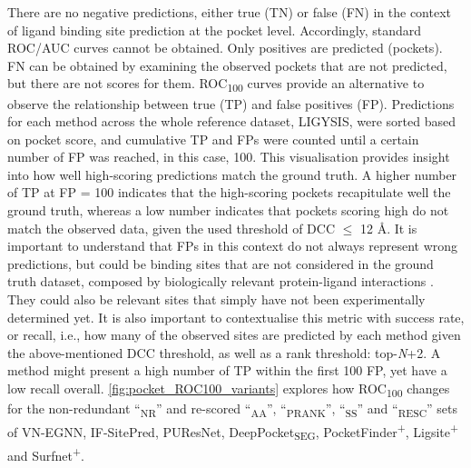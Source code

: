 There are no negative predictions, either true (TN) or false (FN) in the context of ligand binding site prediction at the pocket level. Accordingly, standard ROC/AUC curves cannot be obtained. Only positives are predicted (pockets). FN can be obtained by examining the observed pockets that are not predicted, but there are not scores for them. ROC\textsubscript{100} curves provide an alternative to observe the relationship between true (TP) and false positives (FP). Predictions for each method across the whole reference dataset, LIGYSIS, were sorted based on pocket score, and cumulative TP and FPs were counted until a certain number of FP was reached, in this case, 100. This visualisation provides insight into how well high-scoring predictions match the ground truth. A higher number of TP at FP = 100 indicates that the high-scoring pockets recapitulate well the ground truth, whereas a low number indicates that pockets scoring high do not match the observed data, given the used threshold of DCC $\leq$ 12 \AA{}. It is important to understand that FPs in this context do not always represent wrong predictions, but could be binding sites that are not considered in the ground truth dataset, composed by biologically relevant protein-ligand interactions \cite{YANG_2013_BIOLIP}. They could also be relevant sites that simply have not been experimentally determined yet. It is also important to contextualise this metric with success rate, or recall, i.e., how many of the observed sites are predicted by each method given the above-mentioned DCC threshold, as well as a rank threshold: top-\textit{N}+2. A method might present a high number of TP within the first 100 FP, yet have a low recall overall. \autoref{fig:pocket_ROC100_variants} explores how ROC\textsubscript{100} changes for the non-redundant ``\textsubscript{NR}'' and re-scored ``\textsubscript{AA}'', ``\textsubscript{PRANK}'', ``\textsubscript{SS}'' and ``\textsubscript{RESC}'' sets of VN-EGNN, IF-SitePred, PUResNet, DeepPocket\textsubscript{SEG}, PocketFinder\textsuperscript{+}, Ligsite\textsuperscript{+} and Surfnet\textsuperscript{+}.

